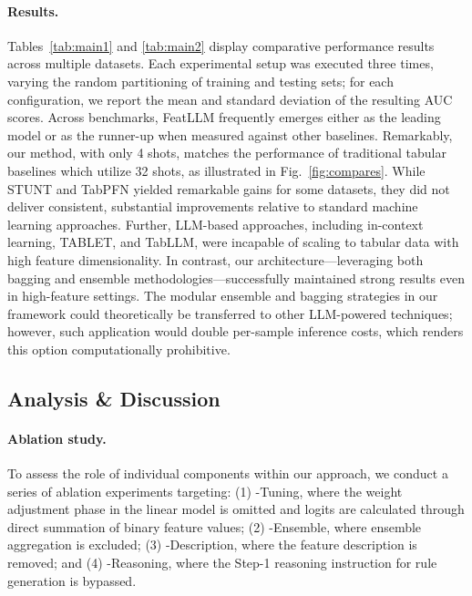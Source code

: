 \vspace*{-0.12in}
\paragraph{Results.}
Tables~\ref{tab:main1} and \ref{tab:main2} display comparative performance results across multiple datasets. Each experimental setup was executed three times, varying the random partitioning of training and testing sets; for each configuration, we report the mean and standard deviation of the resulting AUC scores. Across benchmarks, \textsf{FeatLLM} frequently emerges either as the leading model or as the runner-up when measured against other baselines. Remarkably, our method, with only 4 shots, matches the performance of traditional tabular baselines which utilize 32 shots, as illustrated in Fig.~\ref{fig:compares}. While STUNT and TabPFN yielded remarkable gains for some datasets, they did not deliver consistent, substantial improvements relative to standard machine learning approaches. Further, LLM-based approaches, including in-context learning, TABLET, and TabLLM, were incapable of scaling to tabular data with high feature dimensionality. In contrast, our architecture—leveraging both bagging and ensemble methodologies—successfully maintained strong results even in high-feature settings. The modular ensemble and bagging strategies in our framework could theoretically be transferred to other LLM-powered techniques; however, such application would double per-sample inference costs, which renders this option computationally prohibitive.

\subsection{Analysis \& Discussion}
\label{sec:analysis}
\paragraph{Ablation study.}
To assess the role of individual components within our approach, we conduct a series of ablation experiments targeting: (1) \textsf{-Tuning}, where the weight adjustment phase in the linear model is omitted and logits are calculated through direct summation of binary feature values; (2) \textsf{-Ensemble}, where ensemble aggregation is excluded; (3) \textsf{-Description}, where the feature description is removed; and (4) \textsf{-Reasoning}, where the Step-1 reasoning instruction for rule generation is bypassed.


